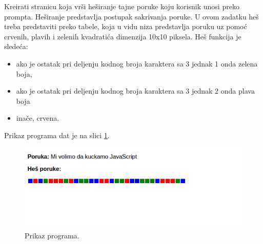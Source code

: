 \begin{primer}
Kreirati stranicu koja vrši heširanje tajne poruke koju korisnik unosi preko prompta. Heširanje predstavlja postupak sakrivanja poruke. U ovom zadatku heš treba predstaviti preko tabele, koja u vidu niza predstavlja poruku uz pomoć crvenih, plavih i zelenih kvadratića dimenzija 10x10 piksela. Heš funkcija je sledeća:
\begin{itemize}
\item ako je ostatak pri deljenju kodnog broja karaktera sa 3 jednak 1 onda zelena boja,
\item ako je ostatak pri deljenju kodnog broja karaktera sa 3 jednak 2 onda plava boja
\item inače, crvena. 
\end{itemize}
Prikaz programa dat je na slici \ref{fig:hes}.
\begin{figure}[h!]
\begin{center}
\includegraphics[scale=0.5]{pictures/hes.png}
\end{center}
\caption{Prikaz programa.}
\label{fig:hes}
\end{figure}

\end{primer}
\newpage

